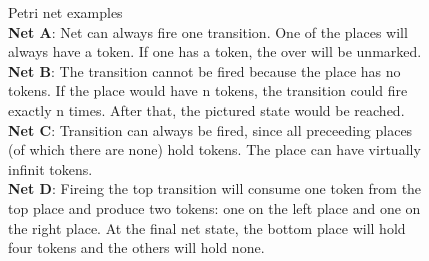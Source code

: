 \begin{figure}
  \caption{
    Petri net examples\\
    \textbf{Net A}: Net can always fire one transition. One of the places will always have a token. If one has a token, the over will be unmarked.\\
    \textbf{Net B}: The transition cannot be fired because the place has no tokens. If the place would have n tokens, the transition could fire exactly n times. After that, the pictured state would be reached.\\
    \textbf{Net C}: Transition can always be fired, since all preceeding places (of which there are none) hold tokens. The place can have virtually infinit tokens.\\
    \textbf{Net D}: Fireing the top transition will consume one token from the top place and produce two tokens: one on the left place and one on the right place. At the final net state, the bottom place will hold four tokens and the others will hold none.
    }
    \label{petrNetExamples}
\end{figure}